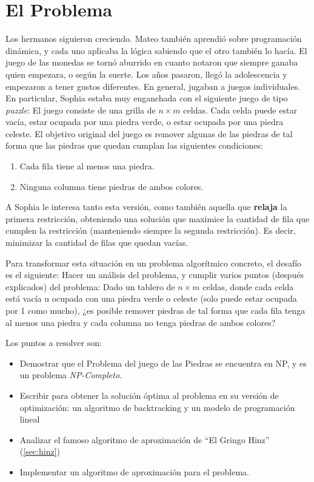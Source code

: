 \section{El Problema}
Los hermanos siguieron creciendo. Mateo también aprendió sobre programación dinámica, y cada uno aplicaba la lógica sabiendo que el otro también lo hacía. El juego de las monedas se tornó aburrido en cuanto notaron que siempre ganaba quien empezara, o según la suerte. Los años pasaron, llegó la adolescencia y empezaron a tener gustos diferentes. En general, jugaban a juegos individuales. En particular, Sophia estaba muy enganchada con el siguiente juego de tipo \textit{puzzle}: El juego consiste de una grilla de $n \times m$ celdas. Cada celda puede estar vacía, estar ocupada por una piedra verde, o estar ocupada por una piedra celeste. El objetivo original del juego es remover algunas de las piedras de tal forma que las piedras que quedan cumplan las siguientes condiciones:

\begin{enumerate}
    \item Cada fila tiene al menos una piedra.
    \item Ninguna columna tiene piedras de ambos colores.
\end{enumerate}

A Sophia le interesa tanto esta versión, como también aquella que \textbf{relaja} la primera restricción, obteniendo una solución que maximice la cantidad de fila que cumplen la restricción (manteniendo siempre la segunda restricción). Es decir, minimizar la cantidad de filas que quedan vacías.


Para transformar esta situación en un problema algorítmico concreto, el desafío es el siguiente:
Hacer un análisis del problema, y cumplir varios puntos (después explicados) del problema:
Dado un tablero de $n \times m$ celdas, donde cada celda está vacía u ocupada con una piedra verde o celeste (solo puede estar ocupada por 1 como mucho), ¿es posible remover piedras de tal forma que cada fila tenga al menos una piedra y cada columna no tenga piedras de ambos colores?

Los puntos a resolver son:
\begin{itemize}
    \item Demostrar que el Problema del juego de las Piedras se encuentra en NP, y es un problema \textit{NP-Completo}.
    \item Escribir para obtener la solución óptima al problema en su versión de optimización: un algoritmo de backtracking y un modelo de programación lineal
    \item Analizar el famoso algoritmo de aproximación de ``El Gringo Hinz'' (\ref{sec:hinz})
    \item Implementar un algoritmo de aproximación para el problema.
\end{itemize}
